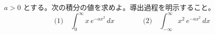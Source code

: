 
$a > 0$ とする。次の積分の値を求めよ。導出過程を明示すること。
\[
\text{(1)}\quad \int_{0}^{\infty} x\, e^{-a x^{2}}\, dx
\qquad\qquad
\text{(2)}\quad \int_{-\infty}^{\infty} x^{2}\, e^{-a x^{2}}\, dx
\]
